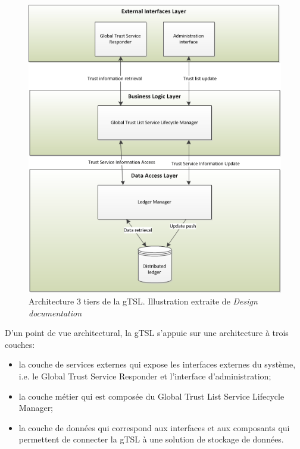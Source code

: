 \documentclass{tnreport}
\begin{document}
\clearpage
\begin{figure}[h]
	\centering
	\includegraphics[scale=0.83]{figures/gTSL-3Tier}
	\caption{Architecture 3 tiers de la gTSL. Illustration extraite de \textit{Design documentation}~\cite{design-document}}
	\label{fig:3tier-archi}
\end{figure}

D'un point de vue architectural, la gTSL s'appuie sur une architecture à trois couches:
\begin{itemize}
	\item la couche de services externes qui expose les interfaces externes du système, i.e. le Global Trust Service Responder et l'interface d'administration;
	\item la couche métier qui est composée du Global Trust List Service Lifecycle Manager;
	\item la couche de données qui correspond aux interfaces et aux composants qui permettent de connecter la gTSL à une solution de stockage de données.
\end{itemize}

\iffalse
\end{document}
